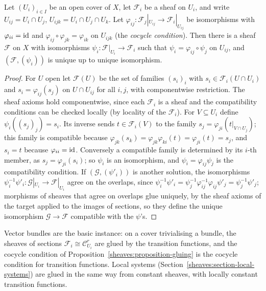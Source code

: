 \begin{proposition}\label{sheaves:proposition-gluing}
Let $(U_i)_{i \in I}$ be an open cover of $X$, let $\mathcal{F}_i$ be a sheaf on $U_i$, and write $U_{ij} = U_i \cap U_j$, $U_{ijk} = U_i \cap U_j \cap U_k$. Let
$\varphi_{ij} \colon \mathcal{F}_j|_{U_{ij}} \to \mathcal{F}_i|_{U_{ij}}$ be isomorphisms with $\varphi_{ii} = \mathrm{id}$ and $\varphi_{ij} \circ \varphi_{jk} = \varphi_{ik}$ on $U_{ijk}$ (the \emph{cocycle condition}). Then there is a sheaf $\mathcal{F}$
on $X$ with isomorphisms $\psi_i \colon \mathcal{F}|_{U_i} \to \mathcal{F}_i$ such that $\psi_i = \varphi_{ij} \circ \psi_j$ on $U_{ij}$, and $(\mathcal{F}, (\psi_i))$ is unique up to unique isomorphism.
\end{proposition}

\begin{proof}
For $U$ open let $\mathcal{F}(U)$ be the set of families $(s_i)_i$ with $s_i \in \mathcal{F}_i(U \cap U_i)$ and $s_i = \varphi_{ij}(s_j)$ on $U \cap U_{ij}$ for all $i, j$, with componentwise restriction. The sheaf
axioms hold componentwise, since each $\mathcal{F}_i$ is a sheaf and the compatibility conditions can be checked locally (by locality of the $\mathcal{F}_i$). For $V \subseteq U_i$ define
$\psi_i(( s_j)_j) = s_i$. Its inverse sends $t \in \mathcal{F}_i(V)$ to the family $s_j = \varphi_{ji}(t|_{V \cap U_j})$; this family is compatible because
$\varphi_{jk}(s_k) = \varphi_{jk}\varphi_{ki}(t) = \varphi_{ji}(t) = s_j$, and $s_i = t$ because $\varphi_{ii} = \mathrm{id}$. Conversely a compatible family is determined by its $i$-th member, as $s_j = \varphi_{ji}(s_i)$; so
$\psi_i$ is an isomorphism, and $\psi_i = \varphi_{ij}\psi_j$ is the compatibility condition. If $(\mathcal{G}, (\psi'_i))$ is another solution, the isomorphisms $\psi_i^{-1}\psi'_i \colon \mathcal{G}|_{U_i} \to \mathcal{F}|_{U_i}$ agree on
the overlaps, since $\psi_i^{-1}\psi'_i = \psi_j^{-1}\varphi_{ij}^{-1}\varphi_{ij}\psi'_j = \psi_j^{-1}\psi'_j$; morphisms of sheaves that agree on overlaps glue uniquely, by the sheaf axioms of the target applied
to the images of sections, so they define the unique isomorphism $\mathcal{G} \to \mathcal{F}$ compatible with the $\psi$'s.
\end{proof}

\begin{example}\label{sheaves:example-gluing}
Vector bundles are the basic instance: on a cover trivialising a bundle, the sheaves of sections $\mathcal{F}_i \cong \mathcal{C}^r_{U_i}$ are glued by the transition functions, and the cocycle condition of
Proposition~\ref{sheaves:proposition-gluing} is the cocycle condition for transition functions. Local systems (Section~\ref{sheaves:section-local-systems}) are glued in the same way from constant sheaves, with locally
constant transition functions.
\end{example}

